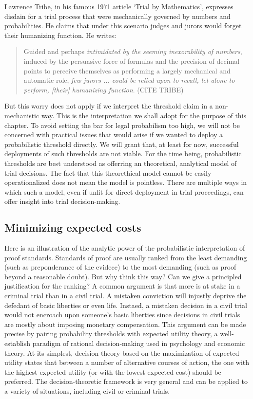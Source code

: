 \documentclass[10pt,dvipsnames,enabledeprecatedfontcommands]{scrartcl}
\begin{document}
Lawrence Tribe, in his famous 1971 article `Trial by Mathematics',
expresses disdain for a trial process that were mechanically governed by
numbers and probabilities. He claims that under this scenario judges and
jurors would forget their humanizing function. He writes:

\begin{quote}
Guided and perhaps \textit{intimidated by the seeming inexorability of numbers}, 
induced by the persuasive force of formulas and the precision of 
decimal points to perceive themselves as performing a largely 
mechanical and automatic role,  \textit{few jurors ... 
could be relied upon to recall, let alone to 
perform, [their] humanizing function}. (CITE TRIBE)
\end{quote}

\noindent
But this worry does not apply if we interpret the threshold claim in a
non-mechanistic way. This is the interpretation we shall adopt for the
purpose of this chapter. To avoid setting the bar for legal probabilism
too high, we will not be concerned with practical issues that would
arise if we wanted to deploy a probabilistic threshold directly. We will
grant that, at least for now, successful deployments of such thresholds
are not viable. For the time being, probabilistic thresholds are best
understood as offerring an theoretical, analytical model of trial
decisions. The fact that this theorethical model cannot be easily
operationalized does not mean the model is pointless. There are multiple
ways in which such a model, even if unfit for direct deployment in trial
proceedings, can offer insight into trial decision-making.

\subsection{Minimizing expected costs}\label{minimizing-expected-costs}

Here is an illustration of the analytic power of the probabilistic
interpretation of proof standards. Standards of proof are usually ranked
from the least demanding (such as preponderance of the evidece) to the
most demanding (such as proof beyond a reasonable doubt). But why think
this way? Can we give a principled justification for the ranking? A
common argument is that more is at stake in a criminal trial than in a
civil trial. A mistaken conviction will injustly deprive the defedant of
basic liberties or even life. Instaed, a mistaken decision in a civil
trial would not encroach upon someone's basic liberties since decisions
in civil trials are mostly about imposing monetary compensation. This
argument can be made precise by pairing probability thresholds with
expected utility theory, a well-establish paradigm of rational
decision-making used in psychology and economic theory. At its simplest,
decision theory based on the maximization of expected utility states
that between a number of alternative courses of action, the one with the
highest expected utility (or with the lowest expected cost) should be
preferred. The decision-theoretic framework is very general and can be
applied to a variety of situations, including civil or criminal trials.
\end{document}
